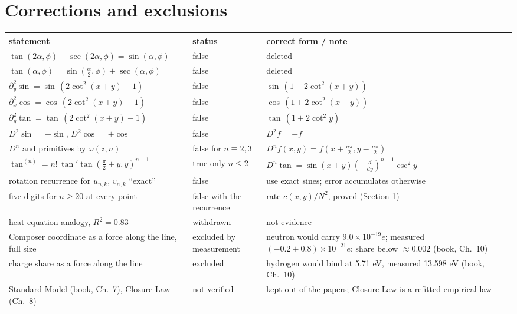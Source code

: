 \documentclass[11pt]{article}
\begin{document}
\section{Corrections and exclusions}\label{sec:corrections}

{\small
\begin{tabularx}{\textwidth}{@{}>{\raggedright\arraybackslash}X >{\raggedright\arraybackslash}p{} >{\raggedright\arraybackslash}X@{}}
\toprule
\textbf{statement} & \textbf{status} & \textbf{correct form / note}\\
\midrule
$\tan(2\alpha,\phi)-\sec(2\alpha,\phi) = \sin(\alpha,\phi)$ & false & deleted\\
$\tan(\alpha,\phi) = \sin(\tfrac\alpha2,\phi)+\sec(\alpha,\phi)$ & false & deleted\\
$\partial_y^2\sin = \sin\,(2\cot^2(x+y)-1)$ & false & $\sin\,(1+2\cot^2(x+y))$\\
$\partial_x^2\cos = \cos\,(2\cot^2(x+y)-1)$ & false & $\cos\,(1+2\cot^2(x+y))$\\
$\partial_y^2\tan = \tan\,(2\cot^2(x+y)-1)$ & false & $\tan\,(1+2\cot^2y)$\\
$D^2\sin = +\sin$, $D^2\cos = +\cos$ & false & $D^2 f = -f$\\
$D^n$ and primitives by $\omega(z,n)$ & false for $n\equiv2,3$ & $D^nf(x,y) = f(x+\tfrac{n\pi}2,y-\tfrac{n\pi}2)$\\
$\tan^{(n)} = n!\,\tan'\tan(\tfrac\pi2+y,y)^{n-1}$ & true only $n\le2$ & $D^n\tan = \sin(x+y)(-\tfrac{d}{dy})^{n-1}\csc^2y$\\
rotation recurrence for $u_{n,k}$, $v_{n,k}$ ``exact'' & false & use exact sines; error accumulates otherwise\\
five digits for $n\ge20$ at every point & false with the recurrence & rate $c(x,y)/N^2$, proved (Section 1)\\
heat-equation analogy, $R^2 = 0.83$ & withdrawn & not evidence\\
Composer coordinate as a force along the line, full size & excluded by measurement & neutron would carry $9.0\times10^{-19}e$; measured $(-0.2\pm0.8)\times10^{-21}e$; share below $\approx0.002$ (book, Ch.~10)\\
charge share as a force along the line & excluded & hydrogen would bind at 5.71 eV, measured 13.598 eV (book, Ch.~10)\\
Standard Model (book, Ch.~7), Closure Law (Ch.~8) & not verified & kept out of the papers; Closure Law is a refitted empirical law\\
\bottomrule
\end{tabularx}}
\end{document}
